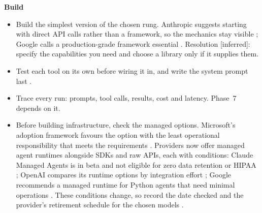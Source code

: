 \documentclass[10pt]{article}
\newcommand{\inferred}{\textsf{\small[inferred]}}
\begin{document}
\textbf{Build}
\begin{itemize}
\item Build the simplest version of the chosen rung. Anthropic suggests starting with direct API calls rather than a framework, so the mechanics stay visible \cite{bea}; Google calls a production-grade framework essential \cite[p.~23]{gintro}. Resolution \inferred: specify the capabilities you need and choose a library only if it supplies them.
\item Test each tool on its own before wiring it in, and write the system prompt last \cite{neudada}.
\item Trace every run: prompts, tool calls, results, cost and latency. Phase~7 depends on it.
\item Before building infrastructure, check the managed options. Microsoft's adoption framework favours the option with the least operational responsibility that meets the requirements \cite[\S3]{mscafstrat}. Providers now offer managed agent runtimes alongside SDKs and raw APIs, each with conditions: Claude Managed Agents is in beta and not eligible for zero data retention or HIPAA \cite[comparison table, ``Data handling'']{maoverview}; OpenAI compares its runtime options by integration effort \cite[``Compare agent runtime options'']{oaiagents}; Google recommends a managed runtime for Python agents that need minimal operations \cite[``Choose an agent runtime'']{gcloudarch}. These conditions change, so record the date checked and the provider's retirement schedule for the chosen models \cite[intro]{claudedeprec}.
\end{itemize}
\end{document}
